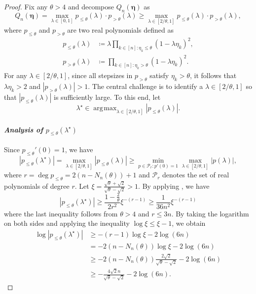 \documentclass[11pt]{article}
\DeclareMathOperator*{\argmax}{arg\!\max}
\newcommand{\abs}[1]{\left\lvert#1\right\rvert}
\newcommand{\schedule}{\bm{\eta}}
\begin{document}
\begin{proof}	
Fix any $\theta > 4$ and decompose $Q_n(\schedule)$ as
\begin{equation}\label{eq:quadratic_lower_bound_small_poly_large_poly}
	Q_n(\schedule)
    = \max_{\lambda\in[0,1]} p_{\leq\theta} (\lambda) \cdot p_{>\theta}(\lambda)
	\geq \max_{\lambda\in[2/\theta,1]} p_{\leq\theta} (\lambda) \cdot p_{>\theta}(\lambda),
\end{equation}
where $p_{\leq\theta}$ and $p_{>\theta}$ are two real polynomials defined as
\begin{align*}
	p_{\leq\theta} (\lambda) &\coloneqq \lambda \prod_{k\in[n]: \eta_k\leq \theta }(1-\lambda \eta_k)^2,\\
	p_{>\theta} (\lambda) &\coloneqq \prod_{k\in[n]: \eta_k > \theta }(1 - \lambda \eta_k)^2.
\end{align*}
For any $\lambda\in[2/\theta,1]$, since all stepsizes in $p_{>\theta}$ satisfy $\eta_k>\theta$, it follows that $\lambda\eta_k>2$ and $\abs{p_{>\theta}(\lambda)} > 1$.
The central challenge is to identify a $\lambda\in[2/\theta,1]$ so that $\abs{p_{\leq\theta}(\lambda)}$ is sufficiently large.
To this end, let
\[
	\lambda^\star \in \argmax_{\lambda\in[2/\theta,1]} \abs{ p_{\leq\theta}(\lambda) }.
\]

\paragraph{\textbf{\textit{Analysis of $p_{\leq\theta}(\lambda^\star)$}}}
Since $p_{\leq\theta}'(0)=1$, we have
\[
	\abs{ p_{\leq\theta}(\lambda^\star) }
	= \max_{\lambda\in[2/\theta,1]} \abs{ p_{\leq\theta}(\lambda) }
	\geq \min_{p\in \mathscr{P}_r: p'(0)=1} \max_{\lambda\in[2/\theta,1]} \abs{ p(\lambda) },
\]
where $r=\deg p_{\leq\theta} = 2(n-N_n(\theta))+1$ and $\mathscr{P}_r$ denotes the set of real polynomials of degree $r$.
Let $\xi = \frac{\sqrt{\theta} + \sqrt{2}}{\sqrt{\theta} - \sqrt{2}} > 1$.
By applying , we have
\[
	\abs{ p_{\leq\theta}(\lambda^\star) } \geq \frac{1-\frac{2}{\theta}}{2r^2} \xi^{-(r-1)}
	\geq \frac{1}{36n^2} \xi^{-(r-1)}
\]
where the last inequality follows from $\theta > 4$ and $r\leq 3n$.
By taking the logarithm on both sides and applying the inequality $\log\xi\leq \xi-1$, we obtain 
\begin{equation}\label{eq:analysis_of_small_polynomial}
\begin{split}
    \log \abs{ p_{\leq\theta}(\lambda^\star) }
    &\geq -(r-1) \log \xi - 2\log (6n) \\
    &= - 2(n-N_n(\theta))\log \xi - 2\log (6n) \\
    &\geq - 2(n-N_n(\theta)) \frac{2\sqrt{2}}{\sqrt{\theta} - \sqrt{2}} - 2\log (6n) \\
    &\geq -\frac{4\sqrt{2}n}{\sqrt{\theta} - \sqrt{2}} - 2\log (6n).
\end{split}
\end{equation}


\end{proof}
\end{document}

